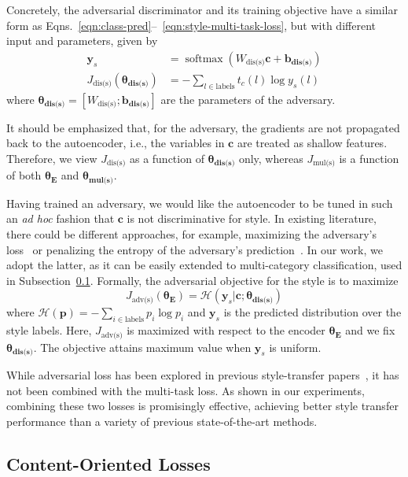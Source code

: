 \documentclass[11pt,a4paper]{article}
\newcommand{\loss}[1]{J_{\text{#1}}}
\newcommand{\nnweight}[1]{\bm{\theta_{\text{#1}}}}
\newcommand{\weight}[1]{W_{\text{#1}}}
\newcommand{\bias}[1]{\bm{b_{\text{#1}}}}
\begin{document}
Concretely, the adversarial discriminator and its training objective have a similar form as Eqns.~\ref{eqn:class-pred}--~\ref{eqn:style-multi-task-loss}, but with different input and parameters, given by
\begin{align}
	\label{eqn:adv-disc-loss}
	\bm y_s                          & = \operatorname{softmax}(\weight{dis(s)} \bm c + \bias{dis(s)}) \\
	\loss{dis(s)}(\nnweight{dis(s)}) & = - \sum\nolimits_{l\in\text{labels}} t_c(l)\log y_s(l)
\end{align}
where $\nnweight{dis(s)}=[\weight{dis(s)}; \bias{dis(s)}]$ are the parameters of the adversary.

It should be emphasized that, for the adversary, the gradients are not propagated back to the autoencoder, i.e., the variables in  $\bm c$ are treated as shallow features. Therefore, we view $\loss{dis(s)}$ as a function of $\nnweight{dis(s)}$ only, whereas $\loss{mul(s)}$ is a function of both $\nnweight{E}$ and $\nnweight{mul(s)}$.

Having trained an adversary, we would like the autoencoder to be tuned in such an \textit{ad hoc} fashion that $\bm c$ is not discriminative for style.
In existing literature, there could be different approaches, for example, maximizing the adversary's loss~\cite{shen2017style,zhao2018adversarially} or penalizing the entropy of the adversary's prediction~\cite{fu2018style}.
In our work, we adopt the latter, as it can be easily extended to multi-category classification, used in Subsection~\ref{ss:content}. Formally, the adversarial objective for the style is to maximize
\begin{equation} \label{eqn:advs}
	\loss{adv(s)}(\nnweight{E})=\mathcal{H}(\bm y_s|\bm c; \nnweight{dis(s)})
\end{equation}
where $\mathcal{H}(\bm p)=-\sum_{i\in\text{labels}}p_i\log p_i$ and $\bm y_s$ is the predicted distribution over the style labels. Here, $\loss{adv(s)}$ is maximized with respect to the encoder $\nnweight{E}$ and we fix $\nnweight{dis(s)}$. The objective attains maximum value when $\bm y_s$ is uniform.

While adversarial loss has been explored in previous style-transfer papers~\cite{shen2017style,fu2018style}, it has not been combined with the multi-task loss. As shown in our experiments, combining these two losses is promisingly effective, achieving better style transfer performance than a variety of previous state-of-the-art methods.

\subsection{Content-Oriented Losses}\label{ss:content}
\end{document}

